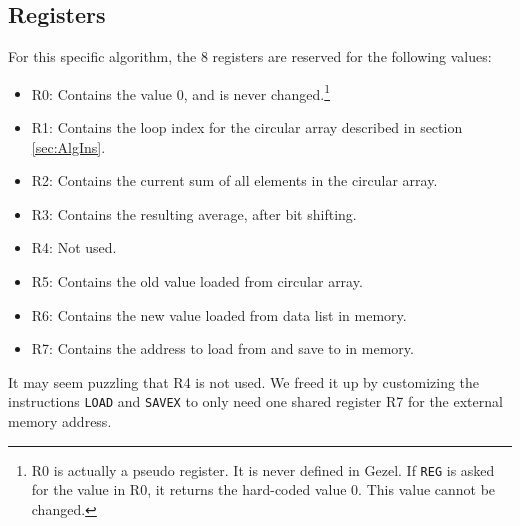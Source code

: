 \subsection{Registers}
\label{sec:registers}
For this specific algorithm, the 8 registers are reserved for the following values: 

\begin{itemize}
    \item R0: Contains the value 0, and is never changed.\footnote{R0 is actually a pseudo register. It is never defined in Gezel. If \texttt{REG} is asked for the value in R0, it returns the hard-coded value 0. This value cannot be changed.} 
    \item R1: Contains the loop index for the circular array described in section \ref{sec:AlgIns}.
    \item R2: Contains the current sum of all elements in the circular array.
    \item R3: Contains the resulting average, after bit shifting.
    \item R4: Not used.
    \item R5: Contains the old value loaded from circular array.
    \item R6: Contains the new value loaded from data list in memory.
    \item R7: Contains the address to load from and save to in memory.
\end{itemize}

It may seem puzzling that R4 is not used. We freed it up by customizing the instructions \texttt{LOAD} and \texttt{SAVEX} to only need one shared register R7 for the external memory address.